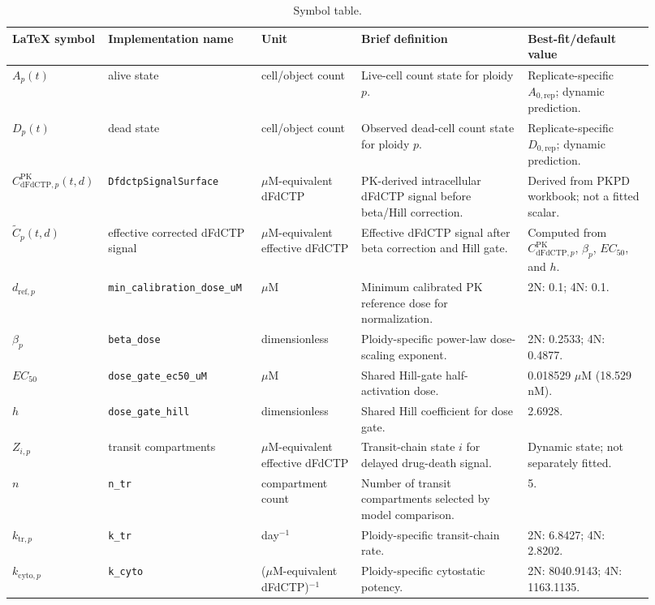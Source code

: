 \documentclass[11pt,notitlepage]{article}
\begin{document}
  \begin{table}[ht]
  \centering
  \footnotesize
  \caption{Symbol table.}
  \label{tab:ntr_model_comparison}
  \begin{tabular}{p{0.1\linewidth}p{0.23\linewidth}p{0.15\linewidth}p{0.25\linewidth}p{0.19\linewidth}}
  \hline
LaTeX symbol & Implementation name & Unit & Brief definition & Best-fit/default value \\
\hline
$A_p(t)$ & alive state & cell/object count & Live-cell count state for ploidy $p$. & Replicate-specific $A_{0,\mathrm{rep}}$; dynamic prediction. \\
$D_p(t)$ & dead state & cell/object count & Observed dead-cell count state for ploidy $p$. & Replicate-specific $D_{0,\mathrm{rep}}$; dynamic prediction. \\
$C_{\mathrm{dFdCTP},p}^{\mathrm{PK}}(t,d)$ & \texttt{DfdctpSignalSurface} & $\mu$M-equivalent dFdCTP & PK-derived intracellular dFdCTP signal before beta/Hill correction. & Derived from PKPD workbook; not a fitted scalar. \\
$\widetilde{C}_{p}(t,d)$ & effective corrected dFdCTP signal & $\mu$M-equivalent effective dFdCTP & Effective dFdCTP signal after beta correction and Hill gate. & Computed from $C_{\mathrm{dFdCTP},p}^{\mathrm{PK}}$, $\beta_p$, $EC_{50}$, and $h$. \\
$d_{\mathrm{ref},p}$ & \texttt{min\_calibration\_dose\_uM} & $\mu$M & Minimum calibrated PK reference dose for normalization. & 2N: 0.1; 4N: 0.1. \\
$\beta_p$ & \texttt{beta\_dose} & dimensionless & Ploidy-specific power-law dose-scaling exponent. & 2N: 0.2533; 4N: 0.4877. \\
$EC_{50}$ & \texttt{dose\_gate\_ec50\_uM} & $\mu$M & Shared Hill-gate half-activation dose. & 0.018529 $\mu$M (18.529 nM). \\
$h$ & \texttt{dose\_gate\_hill} & dimensionless & Shared Hill coefficient for dose gate. & 2.6928. \\
$Z_{i,p}$ & transit compartments & $\mu$M-equivalent effective dFdCTP & Transit-chain state $i$ for delayed drug-death signal. & Dynamic state; not separately fitted. \\
$n$ & \texttt{n\_tr} & compartment count & Number of transit compartments selected by model comparison. & 5. \\
$k_{\mathrm{tr},p}$ & \texttt{k\_tr} & day$^{-1}$ & Ploidy-specific transit-chain rate. & 2N: 6.8427; 4N: 2.8202. \\
$k_{\mathrm{cyto},p}$ & \texttt{k\_cyto} & ($\mu$M-equivalent dFdCTP)$^{-1}$ & Ploidy-specific cytostatic potency. & 2N: 8040.9143; 4N: 1163.1135. \\

\end{tabular}
\end{table}
\end{document}
